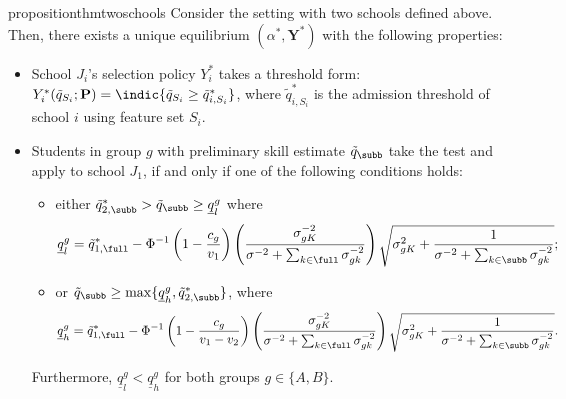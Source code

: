 \begin{restatable}{proposition}{thmtwoschools}
\label{thm.twoschools}
  Consider the setting with two schools defined above. Then, there exists a unique equilibrium $(\alpha^*, \mathbf{Y}^*)$ with the following properties:
  \begin{itemize}
      \item [(i)] School $J_i$'s selection policy $Y^*_i$ takes a threshold form: $Y^*_i (\tilde q_{S_i}; \mathbf{P})= \indic\{\tilde q_{S_i} \geq \tilde q^*_{i, S_i}\}$, where $\tilde q^*_{i, S_i}$ is  the admission threshold of school $i$ using feature set $S_i$.

      \item[(ii)] Students in group $g$ with preliminary skill estimate $\tilde q_{\subb}$ take the test and apply to school $J_1$,  if and only if one of the following conditions holds:
      \begin{itemize}
          \item [1)]  either  $\tilde q^*_{2, \subb} > \tilde q_{\subb} \geq \underline{q}_{l}^g $ where
            \begin{equation}
            \label{eq.q_l_thres}
    \underline{q}_{l}^g = \tilde q_{1, \full}^* - \Phi^{-1} \left(1 - \frac{c_g}{v_1}\right) \left ( \frac{\sigma_{gK}^{-2}}{\sigma^{-2} + \sum_{k \in \full} \sigma_{gk}^{-2}}\right)
\sqrt{\sigma^{2}_{gK} + \frac{1}{\sigma^{-2} + \sum_{k \in \subb} \sigma_{gk}^{-2}} };
\end{equation}

\item[2)] or $\tilde q_{\subb} \geq \max\{\underline{q}_{h}^g , \tilde q^*_{2, \subb}\}$, where
\begin{equation}
\label{eq.q_h_thres}
    \underline{q}_{h}^g = \tilde q_{1, \full}^* - \Phi^{-1} \left(1 - \frac{c_g}{v_1-v_2}\right) \left ( \frac{\sigma_{gK}^{-2}}{\sigma^{-2} + \sum_{k \in \full} \sigma_{gk}^{-2}}\right)
\sqrt{\sigma^{2}_{gK} + \frac{1}{\sigma^{-2} + \sum_{k \in \subb} \sigma_{gk}^{-2}} }.
\end{equation}
      \end{itemize}

     Furthermore, $\underline{q}_{l}^g < \underline{q}_{h}^g $ for both groups $g \in \{A,B\}$.


\normalsize
  \end{itemize}
\end{restatable}



